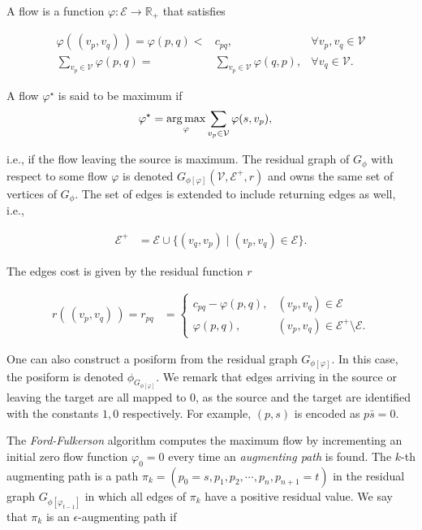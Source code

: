 A flow is a function $\varphi:\mathcal{E}\rightarrow \mathbb{R}_{+}$ that satisfies

\begin{equation*}
	\begin{array}{rll}
	\varphi(\,(v_p,v_q)\,) = \varphi (p,q) <& c_{pq},&  \forall v_p,v_q \in \mathcal{V} \\[1em]
	\sum_{v_p \in \mathcal{V}}{\varphi(p,q)} =& \sum_{v_p \in \mathcal{V}}{\varphi (q,p)}, & \forall v_q \in \mathcal{V}.	
	\end{array}
\end{equation*}

A flow $\varphi ^{\star}$ is said to be maximum if 
\begin{align*}
	\varphi ^{\star} &= \operatorname*{arg\,max}_{\varphi} \sum_{v_p \in \mathcal{V}}{\varphi(s,v_p)},
\end{align*}

i.e., if the flow leaving the source is maximum. The residual graph of $G_{\phi}$ with respect to some flow $\varphi$ is denoted $G_{ \phi [ \varphi ] }(\mathcal{V},\mathcal{E}^+,r)$ and owns the same set of vertices of $G_{\phi}$. The set of edges is extended to include returning edges as well, i.e.,

\begin{align*}
	\mathcal{E}^+ &= \mathcal{E} \cup \{ (v_q,v_p) \; | \; (v_p,v_q) \in \mathcal{E} \}.
\end{align*}

The edges cost is given by the residual function $r$

\begin{align*}
	r(\, (v_p,v_q)\, ) = r_{pq} &= \left\{ \begin{array}{ll}
	c_{pq} - \varphi( p,q ), & (v_p,v_q) \in \mathcal{E}\\
	\varphi( p,q ), & (v_p,v_q) \in \mathcal{E}^+ \setminus \mathcal{E}.
\end{array}\right.	 
\end{align*}

One can also construct a posiform from the residual graph $G_{ \phi [ \varphi ] }$. In this case, the posiform is denoted $\phi_{G_{ \phi [ \varphi ] }}$. We remark that edges arriving in the source or leaving the target are all mapped to $0$, as the source and the target are identified with the constants $1,0$ respectively. For example, $(p,s)$ is encoded as $p\bar{s}=0$.

The \emph{Ford-Fulkerson} algorithm computes the maximum flow by incrementing an initial zero flow function $\varphi_0=0$ every time an \emph{augmenting path} is found. The $k$-th augmenting path is a path $\pi_k = (p_0=s,p_1,p_2,\cdots,p_n,p_{n+1}=t)$ in the residual graph $G_{ \phi [\varphi_{t-1}] }$ in which all edges of $\pi_k$ have a positive residual value. We say that $\pi_k$ is an $\epsilon$-augmenting path if 


